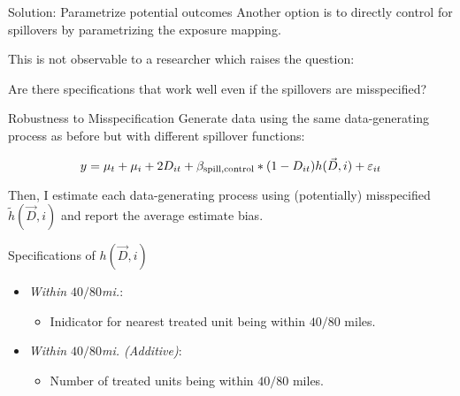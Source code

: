\documentclass[aspectratio=169]{beamer}
\begin{document}

\begin{frame}{Solution: Parametrize potential outcomes}
    Another option is to directly control for spillovers by parametrizing the exposure mapping. 
    
    This is not observable to a researcher which raises the question:

    Are there specifications that work well even if the spillovers are misspecified?
\end{frame}

\begin{frame}{Robustness to Misspecification}
    Generate data using the same data-generating process as before but with different spillover functions:

    \[ 
        y_{\it} = \mu_t + \mu_i + 2 D_{it} + \beta_{\text{spill,control}} * (1-D_{it}) h(\vec{D}, i) + \varepsilon_{it}
    \]


    Then, I estimate each data-generating process using (potentially) misspecified $\tilde{h}(\vec{D}, i)$ and report the average estimate bias.

\end{frame}

\begin{frame}{Specifications of $h(\vec{D}, i)$}
    
    \begin{itemize}
        \item \textit{Within $40/80$mi.}:
        \begin{itemize}
            \item Inidicator for nearest treated unit being within $40/80$ miles.
        \end{itemize}
        
        \item \textit{Within $40/80$mi. (Additive)}: 
        \begin{itemize}
            \item Number of treated units being within $40/80$ miles.
        \end{itemize}
        
    \end{itemize}

\end{frame}

\end{document}

